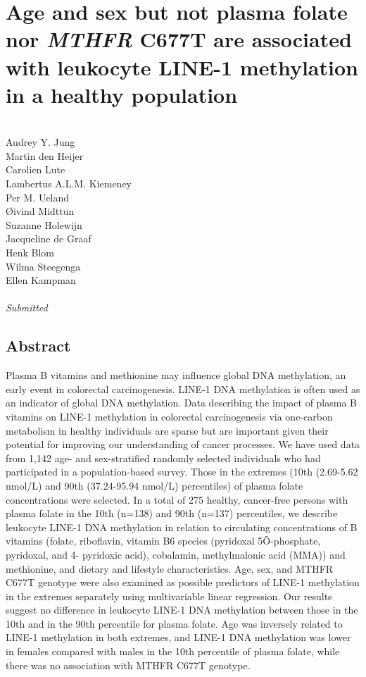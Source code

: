 \chapter{Age and sex but not plasma folate nor \emph{MTHFR} C677T are associated with leukocyte LINE-1 methylation in a healthy population} 
\label{chap3_nbs} 

\quad\\

\noindent
Audrey Y. Jung\\
Martin den Heijer\\
Carolien Lute\\
Lambertus A.L.M. Kiemeney\\
Per M. Ueland\\
{\O}ivind Midttun\\
Suzanne Holewijn\\
Jacqueline de Graaf\\
Henk Blom\\
Wilma Steegenga\\
Ellen Kampman\\

\quad\\


\emph{Submitted}\\


\newpage

\section*{Abstract}

Plasma B vitamins and methionine may influence global DNA methylation, an early event in colorectal carcinogenesis. LINE-1 DNA methylation is often used as an indicator of global DNA methylation. Data describing the impact of plasma B vitamins on LINE-1 methylation in colorectal carcinogenesis via one-carbon metabolism in healthy individuals are sparse but are important given their potential for improving our understanding of cancer processes. We have used data from 1,142 age- and sex-stratified randomly selected individuals who had participated in a population-based survey. Those in the extremes (10th (2.69-5.62 nmol/L) and 90th (37.24-95.94 nmol/L) percentiles) of plasma folate concentrations were selected. In a total of 275 healthy, cancer-free persons with plasma folate in the 10th (n=138) and 90th (n=137) percentiles, we describe leukocyte LINE-1 DNA methylation in relation to circulating concentrations of B vitamins (folate, riboflavin, vitamin B6 species (pyridoxal 5Õ-phosphate, pyridoxal, and 4-
pyridoxic acid), cobalamin, methylmalonic acid (MMA)) and methionine, and dietary and lifestyle characteristics. Age, sex, and MTHFR C677T genotype were also examined as possible predictors of LINE-1 methylation in the extremes separately using multivariable linear regression. Our results suggest no difference in leukocyte LINE-1 DNA methylation between those in the 10th and in the 90th percentile for plasma folate. Age was inversely related to LINE-1 methylation in both extremes, and LINE-1 DNA methylation was lower in females compared with males in the 10th percentile of plasma folate, while there was no association with MTHFR C677T genotype.

